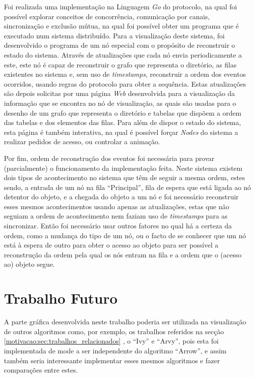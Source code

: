 Foi realizada uma implementação na Linguagem \emph{Go} do protocolo, na qual foi possível explorar conceitos de concorrência, comunicação por canais, sincronização e exclusão mútua,
na qual foi possível obter um programa que é executado num sistema distribuído. 
Para a visualização deste sistema, foi desenvolvido o programa de um nó especial com o propósito de reconstruir o estado do sistema. 
Através de atualizações que cada nó envia periodicamente a este, este nó é capaz de reconstruir o grafo que representa o diretório, as filas existentes no sistema e, sem uso de \emph{timestamps},
reconstruir a ordem dos eventos ocorridos, usando regras do protocolo para obter a sequência. 
Estas atualizações são depois solicitas por uma página \emph{Web} desenvolvida para a visualização da informação que se encontra no nó de visualização, as quais são usadas para
o desenho de um grafo que representa o diretório e tabelas que dispõem a ordem das tabelas e dos elementos das filas. 
Para além de dispor o estado do sistema, esta página é também interativa, na qual é possível forçar \emph{Nodes} do sistema a realizar pedidos de acesso, ou controlar a animação.

Por fim, ordem de reconstrução dos eventos foi necessária para provar (parcialmente) o funcionamento da implementação feita.
Neste sistema existem dois tipos de acontecimento no sistema que têm de seguir a mesma ordem,
estes sendo,
a entrada de um nó na fila ``Principal'', fila de espera que está ligada ao nó detentor do objeto, e a chegada do objeto a um nó e foi necessário
reconstruir esses mesmos acontecimentos usando apenas as atualizações, estas que não seguiam a ordem de acontecimento nem faziam uso de \emph{timestamps} para as sincronizar. 
Então foi necessário usar outros fatores no qual há a certeza da ordem, como a mudança do tipo de um nó, ou o facto de se conhecer que um nó está à espera de outro para obter o acesso
ao objeto para ser possível a reconstrução da ordem pela qual os nós entram na fila e a ordem que o (acesso ao) objeto segue.


\section{Trabalho Futuro}
\label{sec:trab-futuro}
A parte gráfica desenvolvida neste trabalho poderia ser utilizada 
na visualização de outros algoritmos como,
por exemplo, os trabalhos referidos na secção \ref{motivacao:sec:trabalhos_relacionados}
, o ``Ivy'' e ``Arvy'', pois esta foi implementada de mode a ser independente do algoritmo ``Arrow'',
e assim também seria interessante implementar esses mesmos algoritmos e fazer comparações entre estes. \\

